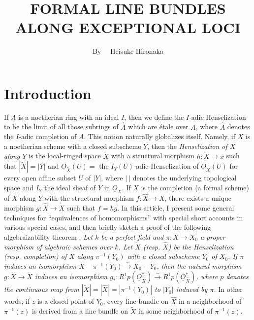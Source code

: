\title{FORMAL LINE BUNDLES ALONG EXCEPTIONAL LOCI}

\author{By~~ Heisuke Hironaka}

\date{}

\maketitle

\setcounter{pageoriginal}{200}
\section*{Introduction}\pageoriginale

If $A$ is a noetherian ring with an ideal $I$, then we define the $I$-adic Henselization to be the limit of all those subrings of $\widehat{A}$ which are \'etale over $A$, where $\widehat{A}$ denotes the $I$-adic completion of $A$. This notion naturally globalizes itself. Namely, if $X$ is a noetherian scheme with a closed subscheme $Y$, then the {\em Henselization of $X$ along $Y$} is the local-ringed space $\widetilde{X}$ with a structural morphism $h:\widetilde{X}\to x$ such that $|\widetilde{X}|=|Y|$ and $\underline{O}_{\widetilde{X}}(U)=$ the $I_{Y}(U)$-adic Henselization of $\underline{O}_{X}(U)$ for every open affine subset $U$ of $|Y|$, where $|~|$ denotes the underlying topological space and $I_{Y}$ the ideal sheaf of $Y$ in $\underline{O}_{X}$. If $\widehat{X}$ is the completion (a formal scheme) of $X$ along $Y$ with the structural morphism $f:\widehat{X}\to X$, there exists a unique morphism $g:\widehat{X}\to \widetilde{X}$ such that $f=hg$. In this article, I present some general techniques for ``equivalences of homomorphisms'' with special short accounts in various special cases, and then briefly sketch a proof of the following algebraizability theorem : {\em Let $k$ be a perfect field and $\pi:X\to X_{0}$ a proper morphism of algebraic schemes over $k$. Let $\widetilde{X}$ (resp. $\widehat{X}$) be the Henselization (resp. completion) of $X$ along $\pi^{-1}(Y_{0})$ with a closed subscheme $Y_{0}$ of $X_{0}$. If $\pi$ induces an isomorphism $X-\pi^{-1}(Y_{0})\xrightarrow{\sim}X_{0}-Y_{0}$, then the natural morphism $g:\widetilde{X}\to \widetilde{X}$ induces an isomorphism $g_{*}:R^{1}p(\underline{O}_{\widetilde{X}}^{*})\xrightarrow{\sim}R^{1}p(\underline{O}_{\widehat{X}}^{*})$, where $p$ denotes the continuous map from $|\widetilde{X}|=|\widehat{X}|=|\pi^{-1}(Y_{0})|$ to $|Y_{0}|$ induced by $\pi$.} In other words, if $z$ is a closed point of $Y_{0}$, every line bundle on $\widehat{X}$ in a neighborhood of $\pi^{-1}(z)$ is derived from a line bundle on $\widetilde{X}$ in some neighborhood of $\pi^{-1}(z)$.

